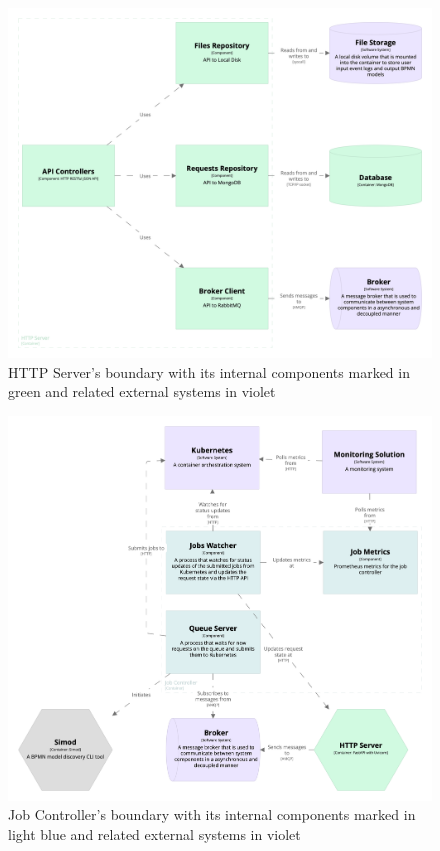 \documentclass[12pt]{article}
\begin{document}
\begin{figure}[t]
    \centering
    \includegraphics[width=\textwidth]{figures/structurizr-1-WebAPI.png}
    \caption{HTTP Server's boundary with its internal components marked in green and related external systems in violet}
    \label{fig:http_server}
\end{figure}

\begin{figure}[p]
    \centering
    \includegraphics[width=\textwidth]{figures/structurizr-1-JobController.png}
    \caption{Job Controller's boundary with its internal components marked in light blue and related external systems in violet}
    \label{fig:job_controller}
\end{figure}
\end{document}
